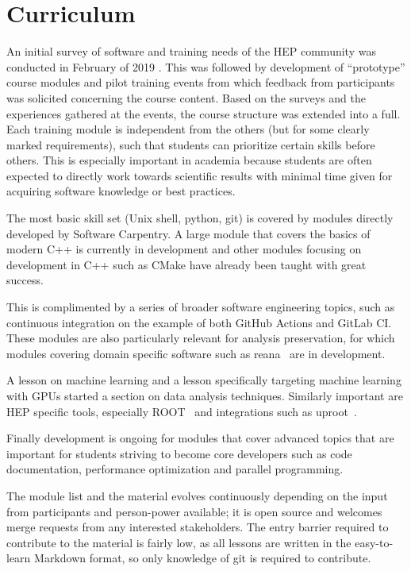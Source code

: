 \documentclass[twocolumn]{svjour3}          %
\begin{document}
\section{Curriculum}\label{sec:Curriculum}

An initial survey of software and training needs of the HEP community was conducted in February of 2019 \cite{david_lange}. This was followed by development of ``prototype'' course modules and  pilot training events from which feedback from participants was solicited concerning the course content.
Based on the surveys and the experiences gathered at the events, the course structure was extended into a full.
Each training module is independent from the others (but for some clearly marked requirements), such that students can prioritize certain skills before others. This is especially important in academia because students are often expected to directly work towards scientific results with minimal time given for acquiring software knowledge or best practices.

The most basic skill set (Unix shell, python, git) is covered by modules directly developed by Software Carpentry. A large module that covers the basics of modern C++ is currently in development and other modules focusing on development in C++ such as CMake have already been taught with great success.

This is complimented by a series of broader software engineering topics, such as continuous integration on the example of both GitHub Actions and GitLab CI. These modules are also particularly relevant for analysis preservation, for which modules covering domain specific software such as reana~\cite{reana} are in development.

A lesson on machine learning and a lesson specifically targeting machine learning with GPUs started a section on data analysis techniques. Similarly important are HEP specific tools, especially ROOT~\cite{root_cern} and integrations such as uproot~\cite{uproot}.

Finally development is ongoing for modules that cover advanced topics that are important for students striving to become core developers such as code documentation, performance optimization and parallel programming.

The module list and the material evolves continuously depending on the input from participants and person-power available; it is open source and welcomes merge requests from any interested stakeholders. 
The entry barrier required to contribute to the material is fairly low, as all lessons are written in the easy-to-learn Markdown format, so only knowledge of git is required to contribute.
\end{document}
